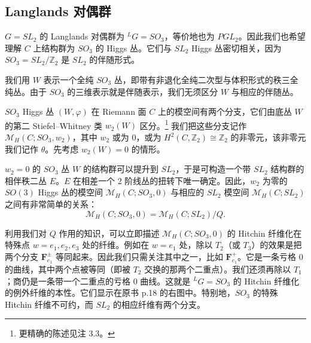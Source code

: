 \documentclass[11pt,a4paper]{article}
\begin{document}


\subsection{Langlands 对偶群}

$G=SL_2$ 的 Langlands 对偶群为 ${}^{L}G=SO_3$，等价地也为 $PGL_2$。因此我们也希望理解 $C$ 上结构群为 $SO_3$ 的 Higgs 丛。它们与 $SL_2$ Higgs 丛密切相关，因为 $SO_3=SL_2/\mathbb{Z}_2$ 是 $SL_2$ 的伴随形式。

我们用 $W$ 表示一个全纯 $SO_3$ 丛，即带有非退化全纯二次型与体积形式的秩三全纯丛。由于 $SO_3$ 的三维表示就是伴随表示，我们无须区分 $W$ 与相应的伴随丛。

$SO_3$ Higgs 丛 $(W,\varphi)$ 在 Riemann 面 $C$ 上的模空间有两个分支，它们由底丛 $W$ 的第二 Stiefel--Whitney 类 $w_2(W)$ 区分。\footnote{更精确的陈述见注 3.3。} 我们把这些分支记作 $\mathcal{M}_H(C;SO_3,w_2)$，其中 $w_2$ 或为 $0$，或为 $H^2(C,\mathbb{Z}_2)\cong\mathbb{Z}_2$ 的非零元，该非零元我们记作 $\theta$。先考虑 $w_2(W)=0$ 的情形。

$w_2=0$ 的 $SO_3$ 丛 $W$ 的结构群可以提升到 $SL_2$，于是可构造一个带 $SL_2$ 结构群的相伴秩二丛 $E$。$E$ 在相差一个 2 阶线丛的扭转下唯一确定。因此，$w_2$ 为零的 $SO(3)$ Higgs 丛的模空间 $\mathcal{M}_H(C;SO_3,0)$ 与相应的 $SL_2$ 模空间 $\mathcal{M}_H(C;SL_2)$ 之间有非常简单的关系：
\begin{equation}\tag{3.20}
\mathcal{M}_H(C;SO_3,0)=\mathcal{M}_H(C;SL_2)/Q.
\end{equation}

利用我们对 $Q$ 作用的知识，可以立即描述 $\mathcal{M}_H(C;SO_3,0)$ 的 Hitchin 纤维化在特殊点 $w=e_1,e_2,e_3$ 处的纤维。例如在 $w=e_1$ 处，除以 $T_2$（或 $T_3$）的效果是把两个分支 $\boldsymbol{F}^\pm_{e_1}$ 等同起来。因此我们只需关注其中之一，比如 $\boldsymbol{F}^+_{e_1}$。它是一条亏格 $0$ 的曲线，其中两个点被等同（即被 $T_2$ 交换的那两个二重点）。我们还须再除以 $T_1$；商仍是一条带一个二重点的亏格 $0$ 曲线。这就是 ${}^{L}G=SO_3$ 的 Hitchin 纤维化的例外纤维的本性。它们显示在原书 p.18 的右图中。特别地，$SO_3$ 的特殊 Hitchin 纤维不可约，而 $SL_2$ 的相应纤维有两个分支。
\end{document}
